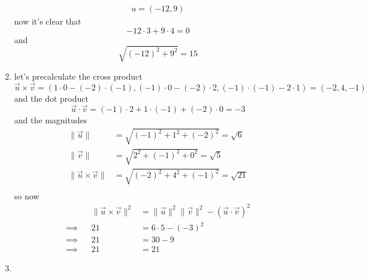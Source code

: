 \documentclass{article}
\begin{document}
\begin{enumerate}
{\begin{displaymath}
\begin{aligned}
                    u = (-12, 9)
                \end{aligned}
            \end{displaymath}
            now it's clear that
            \begin{displaymath}
                -12\cdot3 + 9\cdot4 = 0
            \end{displaymath}
            and
            \begin{displaymath}
                \sqrt{(-12)^2 + 9^2} = 15
            \end{displaymath}
        }
        \item {
            let's precalculate the cross product
            \begin{displaymath}
                \vec{u}\times\vec{v} = (1\cdot0-(-2)\cdot(-1), (-1)\cdot0-(-2)\cdot2, (-1)\cdot(-1)-2\cdot1) = (-2,4,-1)
            \end{displaymath}
            and the dot product
            \begin{displaymath}
                \vec{u}\cdot\vec{v} = (-1)\cdot2+1\cdot(-1)+(-2)\cdot0 = -3
            \end{displaymath}
            and the magnitudes
            \begin{displaymath}
                \begin{aligned}
                    \|\vec{u}\| &= \sqrt{(-1)^2+1^2+(-2)^2} = \sqrt{6} \\
                    \|\vec{v}\| &= \sqrt{2^2+(-1)^2+0^2} = \sqrt{5} \\
                    \|\vec{u}\times\vec{v}\| &= \sqrt{(-2)^2+4^2+(-1)^2} = \sqrt{21} \\
                \end{aligned}
            \end{displaymath}
            so now
            \begin{displaymath}
                \begin{aligned}
                    &&\|\vec{u}\times\vec{v}\|^2 &= \|\vec{u}\|^2\|\vec{v}\|^2 - (\vec{u}\cdot\vec{v})^2  \\ \implies &
                    &21 &= 6\cdot5 - (-3)^2  \\ \implies &
                    &21 &= 30 - 9  \\ \implies &
                    &21 &= 21
                \end{aligned}
            \end{displaymath}
        }
        \item {
}
\end{enumerate}
\end{document}
